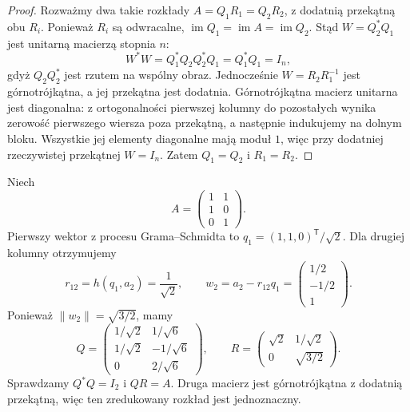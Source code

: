 \begin{proof}
Rozważmy dwa takie rozkłady
\(A=Q_1R_1=Q_2R_2\),
z dodatnią przekątną obu \(R_i\).
Ponieważ \(R_i\) są odwracalne,
\(\operatorname{im}Q_1=
\operatorname{im}A=\operatorname{im}Q_2\).
Stąd \(W=Q_2^*Q_1\)
jest unitarną macierzą stopnia \(n\):
\[
 W^*W=Q_1^*Q_2Q_2^*Q_1
     =Q_1^*Q_1=I_n,
\]
gdyż \(Q_2Q_2^*\)
jest rzutem na wspólny obraz.
Jednocześnie
\(W=R_2R_1^{-1}\)
jest górnotrójkątna,
a jej przekątna jest dodatnia.
Górnotrójkątna macierz unitarna
jest diagonalna:
z ortogonalności pierwszej kolumny
do pozostałych wynika zerowość
pierwszego wiersza poza przekątną,
a następnie indukujemy na
dolnym bloku. Wszystkie jej
elementy diagonalne mają moduł \(1\),
więc przy dodatniej rzeczywistej
przekątnej \(W=I_n\).
Zatem \(Q_1=Q_2\) i \(R_1=R_2\).
\end{proof}

\begin{przyklad}
\label{prz:lin15-qr}
Niech
\[
 A=\begin{pmatrix}
 1&1\\1&0\\0&1
 \end{pmatrix}.
\]
Pierwszy wektor z procesu
Grama--Schmidta to
\(q_1=(1,1,0)^{\mathsf T}/\sqrt2\).
Dla drugiej kolumny
otrzymujemy
\[
 r_{12}=h(q_1,a_2)=\frac1{\sqrt2},
 \qquad
 w_2=a_2-r_{12}q_1
   =\begin{pmatrix}1/2\\-1/2\\1\end{pmatrix}.
\]
Ponieważ \(\|w_2\|=\sqrt{3/2}\),
mamy
\[
 Q=\begin{pmatrix}
  1/\sqrt2&1/\sqrt6\\
  1/\sqrt2&-1/\sqrt6\\
  0&2/\sqrt6
 \end{pmatrix},
 \qquad
 R=\begin{pmatrix}
 \sqrt2&1/\sqrt2\\
 0&\sqrt{3/2}
 \end{pmatrix}.
\]
Sprawdzamy \(Q^*Q=I_2\)
i \(QR=A\). Druga macierz
jest górnotrójkątna
z dodatnią przekątną,
więc ten zredukowany rozkład
jest jednoznaczny.
\end{przyklad}

